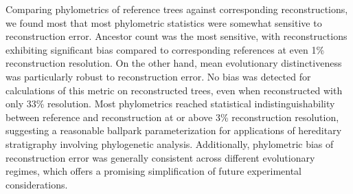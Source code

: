 Comparing phylometrics of reference trees against corresponding reconstructions, we found most that most phylometric statistics were somewhat sensitive to reconstruction error.
Ancestor count was the most sensitive, with reconstructions exhibiting significant bias compared to corresponding references at even 1\% reconstruction resolution.
On the other hand, mean evolutionary distinctiveness was particularly robust to reconstruction error.
No bias was detected for calculations of this metric on reconstructed trees, even when reconstructed with only 33\%  resolution.
Most phylometrics reached statistical indistinguishability between reference and reconstruction at or above 3\% reconstruction resolution, suggesting a reasonable ballpark parameterization for applications of hereditary stratigraphy involving phylogenetic analysis.
Additionally, phylometric bias of reconstruction error was generally consistent across different evolutionary regimes, which offers a promising simplification of future experimental considerations.





